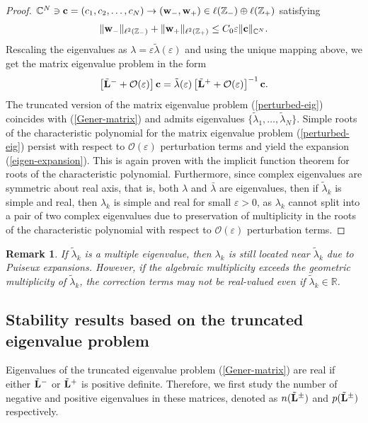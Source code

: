 \documentclass[12pt,reqno]{amsart}
\newtheorem{remark}{Remark}
\begin{document}
\begin{proof}
$\mathbb{C}^N \ni {\bf c}=(c_1,c_2,\dots,c_N) \to ({\bf w}_-,{\bf w}_+) \in \ell(\mathbb{Z}_-) \oplus \ell(\mathbb{Z}_+)$ satisfying
$$
\| {\bf w}_- \|_{\ell^2(\mathbb{Z}_-)} + \| {\bf w}_+ \|_{\ell^2(\mathbb{Z}_+)} \leq C_0 \varepsilon \| {\bf c} \|_{\mathbb{C}^N}. 
$$
Rescaling the eigenvalues as $\lambda = \varepsilon \tilde{\lambda}(\varepsilon)$ and using the unique mapping above, we get 
the matrix eigenvalue problem in the form 
\begin{equation}
\label{perturbed-eig}
\left[ \tilde{\bf L}^- + \mathcal{O}(\varepsilon) \right] {\bf c} = 
\tilde{\lambda}(\varepsilon) \left[ \tilde{\bf L}^+ + \mathcal{O}(\varepsilon) \right]^{-1} {\bf c}.
\end{equation}
The truncated version of the matrix eigenvalue problem (\ref{perturbed-eig}) coincides with (\ref{Gener-matrix}) and admits eigenvalues $\{\tilde{\lambda}_1, \dots, \tilde{\lambda}_N \}$. Simple roots of the characteristic polynomial for the matrix eigenvalue problem (\ref{perturbed-eig}) persist with respect to $\mathcal{O}(\varepsilon)$ perturbation terms and yield the expansion (\ref{eigen-expansion}). This is again proven with the implicit function 
theorem for roots of the characteristic polynomial. Furthermore, since complex eigenvalues are symmetric about real axis, that is, both $\lambda$ and $\bar{\lambda}$ are eigenvalues, then if $\tilde{\lambda}_k$ is simple and real, then $\lambda_k$ is simple and real for small $\varepsilon > 0$, as $\lambda_k$ cannot split into a pair of two complex eigenvalues due to preservation of multiplicity in the roots of the characteristic polynomial with respect to $\mathcal{O}(\varepsilon)$ perturbation terms. 
\end{proof}

\begin{remark}
	If $\tilde{\lambda}_k$ is a multiple eigenvalue, then $\lambda_k$ is still located near $\tilde{\lambda}_k$ due to Puiseux expansions. However, if the algebraic multiplicity exceeds the geometric multiplicity of $\tilde{\lambda}_k$, the correction terms may not be real-valued even if $\tilde{\lambda}_k \in \mathbb{R}$.
\end{remark}

\subsection{Stability results based on the truncated eigenvalue problem}

Eigenvalues of the truncated eigenvalue problem (\ref{Gener-matrix}) 
are real if either $\tilde{\bf L}^-$ or $\tilde{\bf L}^+$ is positive definite. 
Therefore, we first study the number of negative and positive eigenvalues 
in these matrices, denoted as $n(\tilde{\bf L}^{\pm})$ and $p(\tilde{\bf L}^{\pm})$ respectively.
\end{document}
